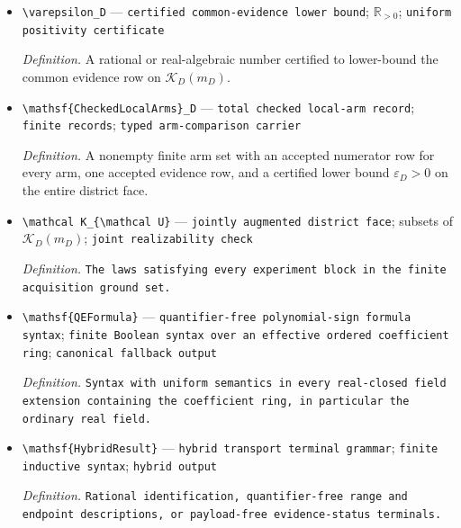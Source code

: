 \documentclass{article}
\begin{document}
\begin{itemize}
  \par\smallskip\noindent\emph{Definition.} The menu expression derived for the context event indexed by \(s,a,D,h\).
  \item \texttt{\textbackslash{}\allowbreak{}varepsilon\_\allowbreak{}D} --- \texttt{certified common-\allowbreak{}evidence lower bound}; \(\mathbb R_{>0}\); \texttt{uniform positivity certificate}
  \par\smallskip\noindent\emph{Definition.} A rational or real-algebraic number certified to lower-bound the common evidence row on \(\mathcal K_D(m_D)\).
  \item \texttt{\textbackslash{}\allowbreak{}mathsf\{CheckedLocalArms\}\allowbreak{}\_\allowbreak{}D} --- \texttt{total checked local-\allowbreak{}arm record}; \texttt{finite records}; \texttt{typed arm-\allowbreak{}comparison carrier}
  \par\smallskip\noindent\emph{Definition.} A nonempty finite arm set with an accepted numerator row for every arm, one accepted evidence row, and a certified lower bound \(\varepsilon_D>0\) on the entire district face.
  \item \texttt{\textbackslash{}\allowbreak{}mathcal K\_\allowbreak{}\{\textbackslash{}\allowbreak{}mathcal U\}\allowbreak{}} --- \texttt{jointly augmented district face}; subsets of \(\mathcal K_D(m_D)\); \texttt{joint realizability check}
  \par\smallskip\noindent\emph{Definition.} \texttt{The laws satisfying every experiment block in the finite acquisition ground set.}
  \item \texttt{\textbackslash{}\allowbreak{}mathsf\{QEFormula\}\allowbreak{}} --- \texttt{quantifier-\allowbreak{}free polynomial-\allowbreak{}sign formula syntax}; \texttt{finite Boolean syntax over an effective ordered coefficient ring}; \texttt{canonical fallback output}
  \par\smallskip\noindent\emph{Definition.} \texttt{Syntax with uniform semantics in every real-\allowbreak{}closed field extension containing the coefficient ring,\allowbreak{} in particular the ordinary real field.}
  \item \texttt{\textbackslash{}\allowbreak{}mathsf\{HybridResult\}\allowbreak{}} --- \texttt{hybrid transport terminal grammar}; \texttt{finite inductive syntax}; \texttt{hybrid output}
  \par\smallskip\noindent\emph{Definition.} \texttt{Rational identification,\allowbreak{} quantifier-\allowbreak{}free range and endpoint descriptions,\allowbreak{} or payload-\allowbreak{}free evidence-\allowbreak{}status terminals.}

\end{itemize}
\end{document}
